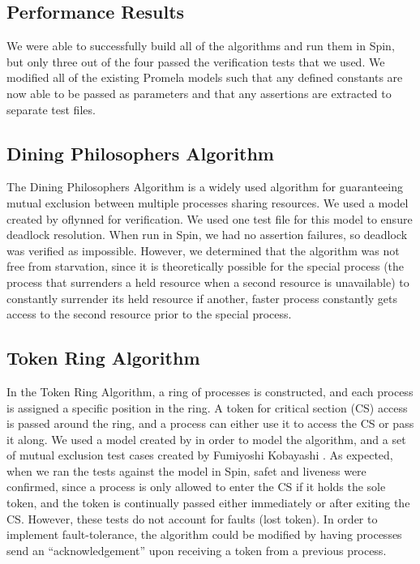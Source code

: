 \documentclass[12pt]{article}
\begin{document}
\begin{flushleft}
\section{Performance Results}
We were able to successfully build all of the algorithms and run them in Spin,
but only three out of the four passed the verification tests that we used. We
modified all of the existing Promela models such that any defined constants are
now able to be passed as parameters and that any assertions are extracted to
separate test files.

\subsection{Dining Philosophers Algorithm}
The Dining Philosophers Algorithm is a widely used algorithm for guaranteeing
mutual exclusion between multiple processes sharing resources. We used a model
created by oflynned \cite{din:phil} for verification. We used one test file for
this model to ensure deadlock resolution. When run in
Spin, we had no assertion failures, so deadlock was verified as
impossible. However, we determined that the algorithm was not free from
starvation, since it is theoretically possible for the special process (the
process that surrenders a held resource when a second resource is unavailable)
to constantly surrender its held resource if another, faster process constantly
gets access to the second resource prior to the special process.


\subsection{Token Ring Algorithm}
In the Token Ring Algorithm, a ring of processes is constructed, and each
process is assigned a specific position in the ring. A token for critical
section (CS) access is passed around the ring, and a process can either use it
to access the CS or pass it along. We used a model created by \cite{toking} in
order to model the algorithm, and a set of mutual exclusion test cases created
by Fumiyoshi Kobayashi \cite{kobayashi}. As expected, when we ran the tests
against the model in Spin, safet and liveness were confirmed, since a process is
only allowed to enter the CS if it holds the sole token, and the token is
continually passed either immediately or after exiting the CS. However, these
tests do not account for faults (lost token). In order to implement
fault-tolerance, the algorithm could be modified by having processes send an
“acknowledgement” upon receiving a token from a previous process.


\end{flushleft}
\end{document}
